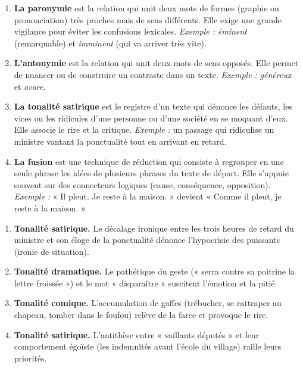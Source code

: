 \documentclass[11pt]{article}
\newcommand{\cle}[1]{{\popxbold\color{popdark}#1}}
\begin{document}
\begin{corrige}
\begin{enumerate}
\item \textbf{La \cle{paronymie}} est la relation qui unit deux mots de formes (graphie ou prononciation) très proches mais de sens différents. Elle exige une grande vigilance pour éviter les \cle{confusions lexicales}. \emph{Exemple :} \emph{éminent} (remarquable) et \emph{imminent} (qui va arriver très vite).
\item \textbf{L'\cle{antonymie}} est la relation qui unit deux mots de sens opposés. Elle permet de \cle{nuancer} ou de \cle{construire un contraste} dans un texte. \emph{Exemple :} \emph{généreux} et \emph{avare}.
\item \textbf{La \cle{tonalité satirique}} est le registre d'un texte qui dénonce les défauts, les vices ou les ridicules d'une personne ou d'une société en se moquant d'eux. Elle associe le \cle{rire} et la \cle{critique}. \emph{Exemple :} un passage qui ridiculise un ministre vantant la ponctualité tout en arrivant en retard.
\item \textbf{La \cle{fusion}} est une technique de réduction qui consiste à regrouper en une seule phrase les idées de plusieurs phrases du texte de départ. Elle s'appuie souvent sur des \cle{connecteurs logiques} (cause, conséquence, opposition). \emph{Exemple :} « Il pleut. Je reste à la maison. » devient « \cle{Comme} il pleut, je reste à la maison. »
\end{enumerate}
\end{corrige}

\begin{corrige}
\begin{enumerate}
\item \textbf{Tonalité \cle{satirique}.} Le \cle{décalage ironique} entre les trois heures de retard du ministre et son éloge de la ponctualité dénonce l'hypocrisie des puissants (\cle{ironie de situation}).
\item \textbf{Tonalité \cle{dramatique}.} Le \cle{pathétique} du geste (« serra contre sa poitrine la lettre froissée ») et le mot « disparaître » suscitent l'\cle{émotion} et la \cle{pitié}.
\item \textbf{Tonalité \cle{comique}.} L'\cle{accumulation} de gaffes (trébucher, se rattraper au chapeau, tomber dans le foufou) relève de la \cle{farce} et provoque le \cle{rire}.
\item \textbf{Tonalité \cle{satirique}.} L'\cle{antithèse} entre « vaillants députés » et leur comportement égoïste (les indemnités avant l'école du village) \cle{raille} leurs priorités.
\end{enumerate}
\end{corrige}
\end{document}
